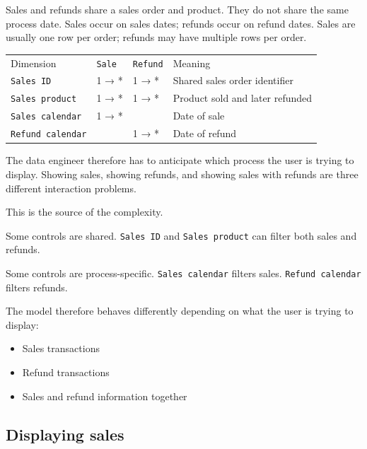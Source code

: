 \documentclass[10pt,openany,10pt]{book}
\providecommand{\tightlist}{%
  \setlength{\itemsep}{0pt}\setlength{\parskip}{0pt}}
\newcounter{none}
\let\podeToprule\toprule
\let\podeMidrule\midrule
\let\podeBottomrule\bottomrule
\renewcommand{\toprule}{\arrayrulecolor{pbiGrid}\podeToprule}
\renewcommand{\midrule}{\arrayrulecolor{pbiGrid}\podeMidrule}
\renewcommand{\bottomrule}{\arrayrulecolor{pbiGrid}\podeBottomrule}
\begin{document}
Sales and refunds share a sales order and product. They do not share the
same process date. Sales occur on sales dates; refunds occur on refund
dates. Sales are usually one row per order; refunds may have multiple
rows per order.

{\def\LTcaptype{none} %
\begin{longtable}[]{@{}llll@{}}
\toprule\noalign{}
Dimension & \texttt{\textquotesingle{}Sale\textquotesingle{}} &
\texttt{\textquotesingle{}Refund\textquotesingle{}} & Meaning \\
\midrule\noalign{}
\endhead
\bottomrule\noalign{}
\endlastfoot
\texttt{\textquotesingle{}Sales\ ID\textquotesingle{}} & 1 → * & 1 → * &
Shared sales order identifier \\
\texttt{\textquotesingle{}Sales\ product\textquotesingle{}} & 1 → * & 1
→ * & Product sold and later refunded \\
\texttt{\textquotesingle{}Sales\ calendar\textquotesingle{}} & 1 → * & &
Date of sale \\
\texttt{\textquotesingle{}Refund\ calendar\textquotesingle{}} & & 1 → *
& Date of refund \\
\end{longtable}
}

The data engineer therefore has to anticipate which process the user is
trying to display. Showing sales, showing refunds, and showing sales
with refunds are three different interaction problems.

This is the source of the complexity.

Some controls are shared.
\texttt{\textquotesingle{}Sales\ ID\textquotesingle{}} and
\texttt{\textquotesingle{}Sales\ product\textquotesingle{}} can filter
both sales and refunds.

Some controls are process-specific.
\texttt{\textquotesingle{}Sales\ calendar\textquotesingle{}} filters
sales. \texttt{\textquotesingle{}Refund\ calendar\textquotesingle{}}
filters refunds.

The model therefore behaves differently depending on what the user is
trying to display:

\begin{itemize}
\tightlist
\item
  Sales transactions
\item
  Refund transactions
\item
  Sales and refund information together
\end{itemize}

\subsection{Displaying sales}\label{displaying-sales}
\end{document}
